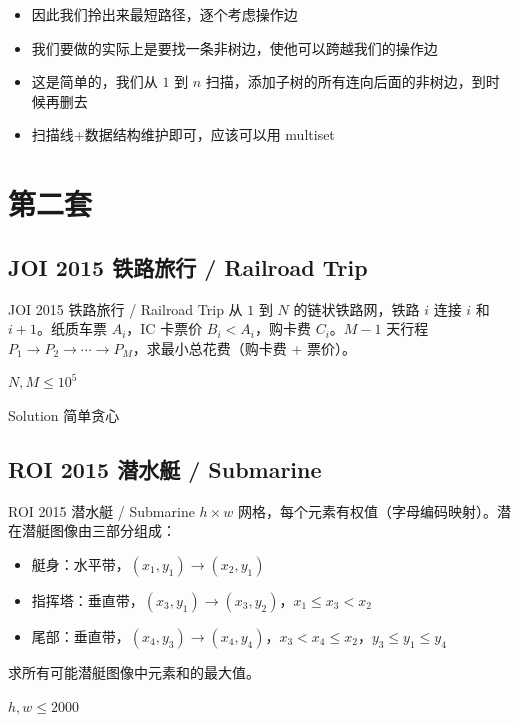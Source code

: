 ﻿\documentclass[aspectratio=169]{ctexbeamer}
\begin{document}
\begin{frame}
    \begin{itemize}
        \item 因此我们拎出来最短路径，逐个考虑操作边
        \item 我们要做的实际上是要找一条非树边，使他可以跨越我们的操作边
        \item 这是简单的，我们从 $1$ 到 $n$ 扫描，添加子树的所有连向后面的非树边，到时候再删去
        \item 扫描线+数据结构维护即可，应该可以用 multiset
    \end{itemize}
\end{frame}




\section{第二套}

\subsection{JOI 2015 铁路旅行 / Railroad Trip}
\begin{frame}{JOI 2015 铁路旅行 / Railroad Trip}
    从 $1$ 到 $N$ 的链状铁路网，铁路 $i$ 连接 $i$ 和 $i+1$。纸质车票 $A_i$，IC 卡票价 $B_i<A_i$，购卡费 $C_i$。$M-1$ 天行程 $P_1\to P_2\to\cdots\to P_M$，求最小总花费（购卡费 + 票价）。
    
    $N,M\le 10^5$
\end{frame}

\begin{frame}{Solution}
    简单贪心
\end{frame}









\subsection{ROI 2015 潜水艇 / Submarine}
\begin{frame}{ROI 2015 潜水艇 / Submarine}
    $h\times w$ 网格，每个元素有权值（字母编码映射）。潜在潜艇图像由三部分组成：
    \begin{itemize}
        \item 艇身：水平带，$(x_1,y_1)\to(x_2,y_1)$
        \item 指挥塔：垂直带，$(x_3,y_1)\to(x_3,y_2)$，$x_1\le x_3<x_2$
        \item 尾部：垂直带，$(x_4,y_3)\to(x_4,y_4)$，$x_3<x_4\le x_2$，$y_3\le y_1\le y_4$
    \end{itemize}
    求所有可能潜艇图像中元素和的最大值。
    
    $h,w\le 2000$
\end{frame}
\end{document}
